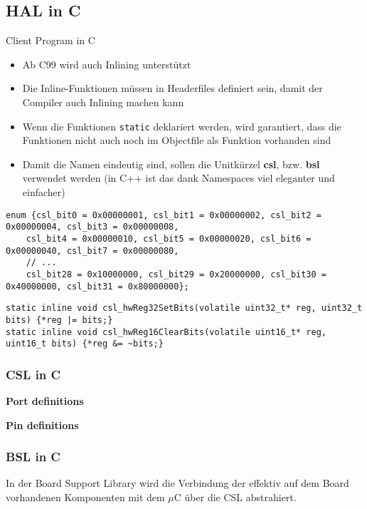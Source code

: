 \subsection{HAL in C}
Client Program in C

\begin{itemize}
  \item Ab C99 wird auch Inlining unterstützt
  \item Die Inline-Funktionen müssen in Headerfiles definiert sein, damit der Compiler auch Inlining machen kann
  \item Wenn die Funktionen \lstinline[style=C]{static} deklariert werden, wird garantiert, dass die Funktionen nicht auch noch im Objectfile als Funktion vorhanden sind
  \item Damit die Namen eindeutig sind, sollen die Unitkürzel \textbf{csl}, bzw. \textbf{bsl} verwendet werden (in C++ ist das dank Namespaces viel eleganter und einfacher)
\end{itemize}
\begin{lstlisting}[style=C]
enum {csl_bit0 = 0x00000001, csl_bit1 = 0x00000002, csl_bit2 = 0x00000004, csl_bit3 = 0x00000008,
    csl_bit4 = 0x00000010, csl_bit5 = 0x00000020, csl_bit6 = 0x00000040, csl_bit7 = 0x00000080,
    // ...
    csl_bit28 = 0x10000000, csl_bit29 = 0x20000000, csl_bit30 = 0x40000000, csl_bit31 = 0x80000000};
\end{lstlisting}
\begin{lstlisting}[style=C]
static inline void csl_hwReg32SetBits(volatile uint32_t* reg, uint32_t bits) {*reg |= bits;}
static inline void csl_hwReg16ClearBits(volatile uint16_t* reg, uint16_t bits) {*reg &= ~bits;}
\end{lstlisting}

\subsubsection{CSL in C}
\textbf{Port definitions}


\textbf{Pin definitions}


\subsubsection{BSL in C}
In der Board Support Library wird die Verbindung der effektiv auf dem Board vorhandenen Komponenten mit dem $\mu$C über die CSL abstrahiert.


